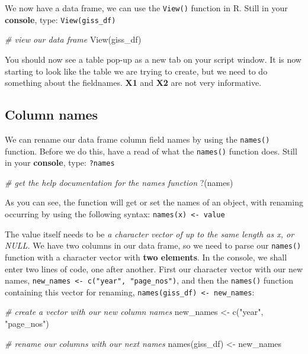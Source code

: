 \documentclass[
]{book}
\newenvironment{Shaded}{\begin{snugshade}}{\end{snugshade}}
\newcommand{\AttributeTok}[1]{\textcolor[rgb]{0.77,0.63,0.00}{#1}}
\newcommand{\CommentTok}[1]{\textcolor[rgb]{0.56,0.35,0.01}{\textit{#1}}}
\newcommand{\FunctionTok}[1]{\textcolor[rgb]{0.00,0.00,0.00}{#1}}
\newcommand{\NormalTok}[1]{#1}
\newcommand{\OtherTok}[1]{\textcolor[rgb]{0.56,0.35,0.01}{#1}}
\newcommand{\StringTok}[1]{\textcolor[rgb]{0.31,0.60,0.02}{#1}}
\begin{document}
We now have a data frame, we can use the \texttt{View()} function in R. Still in your \textbf{console}, type: \texttt{View(giss\_df)}

\begin{Shaded}
\begin{Highlighting}[]
\CommentTok{\# view our data frame}
\FunctionTok{View}\NormalTok{(giss\_df)}
\end{Highlighting}
\end{Shaded}

You should now see a table pop-up as a new tab on your script window. It is now starting to look like the table we are trying to create, but we need to do something about the fieldnames. \textbf{X1} and \textbf{X2} are not very informative.

\hypertarget{column-names}{%
\subsection{Column names}\label{column-names}}

We can rename our data frame column field names by using the \texttt{names()} function. Before we do this, have a read of what the \texttt{names()} function does. Still in your \textbf{console}, type: \texttt{?names}

\begin{Shaded}
\begin{Highlighting}[]
\CommentTok{\# get the help documentation for the names function}
\StringTok{\textasciigrave{}}\AttributeTok{?}\StringTok{\textasciigrave{}}\NormalTok{(names)}
\end{Highlighting}
\end{Shaded}

As you can see, the function will get or set the names of an object, with renaming occurring by using the following syntax: \texttt{names(x)\ \textless{}-\ value}

The value itself needs to be \emph{a character vector of up to the same length as x, or NULL.} We have two columns in our data frame, so we need to parse our \texttt{names()} function with a character vector with \textbf{two elements}. In the console, we shall enter two lines of code, one after another. First our character vector with our new names, \texttt{new\_names\ \textless{}-\ c("year",\ "page\_nos")}, and then the \texttt{names()} function containing this vector for renaming, \texttt{names(giss\_df)\ \textless{}-\ new\_names}:

\begin{Shaded}
\begin{Highlighting}[]
\CommentTok{\# create a vector with our new column names}
\NormalTok{new\_names }\OtherTok{\textless{}{-}} \FunctionTok{c}\NormalTok{(}\StringTok{"year"}\NormalTok{, }\StringTok{"page\_nos"}\NormalTok{)}

\CommentTok{\# rename our columns with our next names}
\FunctionTok{names}\NormalTok{(giss\_df) }\OtherTok{\textless{}{-}}\NormalTok{ new\_names}
\end{Highlighting}
\end{Shaded}
\end{document}

